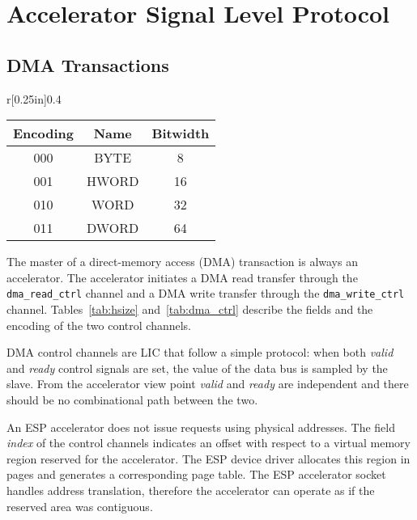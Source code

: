 \chapter{Accelerator Signal Level Protocol}

\section{DMA Transactions}

\begin{wraptable}{r}[0.25in]{0.4\textwidth}
\centering
\small
\caption{Encoding of DMA size}\label{tab:hsize}
\begin{tabular}{|c|c|c|}
\hline
  \textbf{Encoding} & \textbf{Name} & \textbf{Bitwidth} \\
\hline
  000  & BYTE & 8 \\
\hline
  001  & HWORD & 16 \\
\hline
  010  & WORD & 32 \\
\hline
  011  & DWORD & 64 \\
\hline
\end{tabular}
\end{wraptable}
{
The master of a direct-memory access (DMA) transaction is always an
accelerator. The accelerator initiates a DMA read transfer through the
\texttt{dma\_read\_ctrl} channel and a DMA write transfer through the
\texttt{dma\_write\_ctrl} channel. Tables~\ref{tab:hsize} and~\ref{tab:dma_ctrl} describe
the fields and the encoding of the two control channels.

DMA control channels are LIC that follow a simple protocol: when both {\it
  valid} and {\it ready} control signals are set, the value of the data bus is
sampled by the slave. From the accelerator view point {\it valid} and {\it
  ready} are independent and there should be no combinational path between the
two.

An ESP accelerator does not issue requests using physical addresses. The field
{\it index} of the control channels indicates an offset with respect to a
virtual memory region reserved for the accelerator. The ESP device driver
allocates this region in pages and generates a corresponding page table. The ESP
accelerator socket handles address translation, therefore the accelerator can
operate as if the reserved area was contiguous.
}

